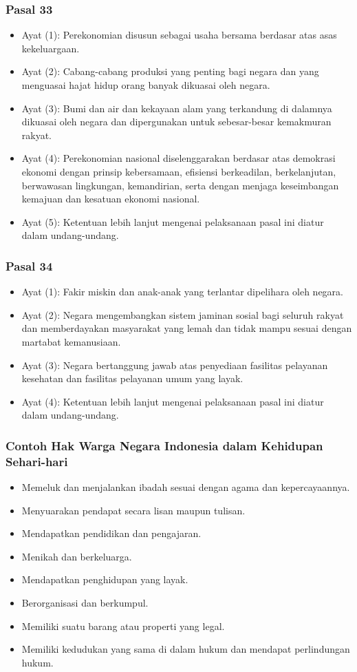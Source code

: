 \subsubsection{Pasal 33}
\begin{itemize}
\item Ayat (1): Perekonomian disusun sebagai usaha bersama berdasar atas asas kekeluargaan.
\item Ayat (2): Cabang-cabang produksi yang penting bagi negara dan yang menguasai hajat hidup orang banyak dikuasai oleh negara.
\item Ayat (3): Bumi dan air dan kekayaan alam yang terkandung di dalamnya dikuasai oleh negara dan dipergunakan untuk sebesar-besar kemakmuran rakyat.
\item Ayat (4): Perekonomian nasional diselenggarakan berdasar atas demokrasi ekonomi dengan prinsip kebersamaan, efisiensi berkeadilan, berkelanjutan, berwawasan lingkungan, kemandirian, serta dengan menjaga keseimbangan kemajuan dan kesatuan ekonomi nasional.
\item Ayat (5): Ketentuan lebih lanjut mengenai pelaksanaan pasal ini diatur dalam undang-undang.
\end{itemize}

\subsubsection{Pasal 34}
\begin{itemize}
\item Ayat (1): Fakir miskin dan anak-anak yang terlantar dipelihara oleh negara.
\item Ayat (2): Negara mengembangkan sistem jaminan sosial bagi seluruh rakyat dan memberdayakan masyarakat yang lemah dan tidak mampu sesuai dengan martabat kemanusiaan.
\item Ayat (3): Negara bertanggung jawab atas penyediaan fasilitas pelayanan kesehatan dan fasilitas pelayanan umum yang layak.
\item Ayat (4): Ketentuan lebih lanjut mengenai pelaksanaan pasal ini diatur dalam undang-undang.
\end{itemize}

\subsubsection{Contoh Hak Warga Negara Indonesia dalam Kehidupan Sehari-hari}
\begin{itemize}
\item Memeluk dan menjalankan ibadah sesuai dengan agama dan kepercayaannya.
\item Menyuarakan pendapat secara lisan maupun tulisan.
\item Mendapatkan pendidikan dan pengajaran.
\item Menikah dan berkeluarga.
\item Mendapatkan penghidupan yang layak.
\item Berorganisasi dan berkumpul.
\item Memiliki suatu barang atau properti yang legal.
\item Memiliki kedudukan yang sama di dalam hukum dan mendapat perlindungan hukum.
\end{itemize}

